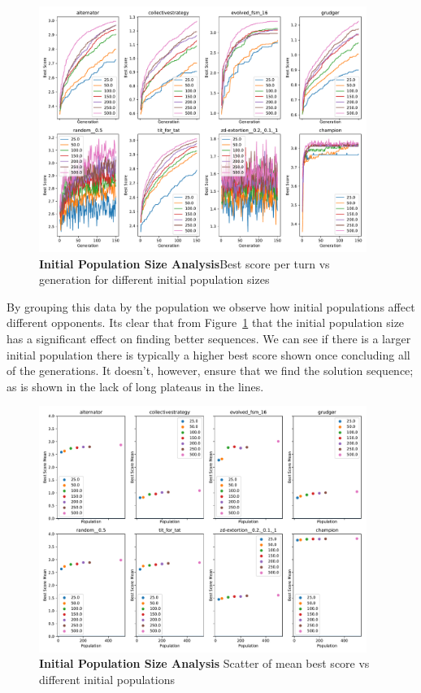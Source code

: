 \begin{figure}[ht]
    \includegraphics[width=0.95\textwidth, keepaspectratio, center]{./img/plots/INIT_POP_bs_v_gens_all.pdf}
    \caption{\textbf{Initial Population Size Analysis}Best score per turn vs generation for different initial population sizes}\label{fig:INIT-POP-bs-v-gens-all}
\end{figure}

By grouping this data by the population we observe how initial populations affect different opponents.
Its clear that from Figure~\ref{fig:INIT-POP-bs-v-gens-all} that the initial population size has a significant effect on finding better sequences.
We can see if there is a larger initial population there is typically a higher best score shown once concluding all of the generations.
It doesn't, however, ensure that we find the solution sequence;
as is shown in the lack of long plateaus in the lines.

\begin{figure}[ht]
    \includegraphics[width=0.95\textwidth, keepaspectratio, center]{./img/plots/INIT_POP_mean_bs_diff_v_init_pop_all.pdf}
    \caption{\textbf{Initial Population Size Analysis} Scatter of mean best score vs different initial populations}\label{fig:INIT-POP-mean-bs-v-init-pop-all}
\end{figure}

